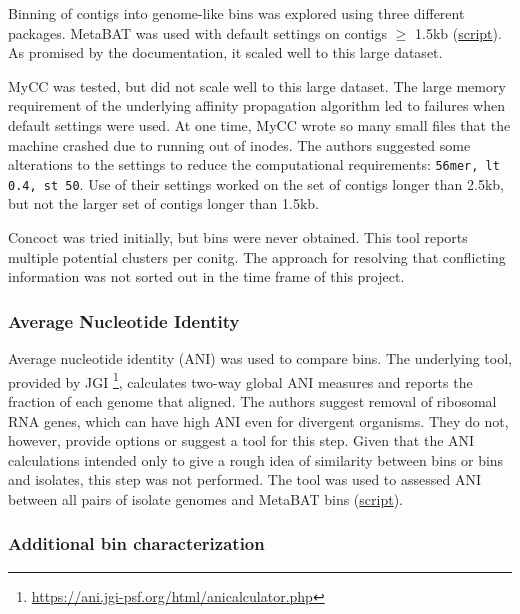 Binning of contigs into genome-like bins was explored using three different packages.
MetaBAT was used with default settings on contigs $\geq$ 1.5kb (\href{https://github.com/BeckResearchLab/meta4/blob/master/m4b_binning/assembly/2.metabat}{script}).
As promised by the documentation, it scaled well to this large dataset. %

MyCC was tested, but did not scale well to this large dataset.
The large memory requirement of the underlying affinity propagation algorithm led to failures when default settings were used.
At one time, MyCC wrote so many small files that the machine crashed due to running out of inodes.
The authors suggested some alterations to the settings to reduce the computational requirements:  \texttt{56mer, lt 0.4, st 50}.
Use of their settings worked on the set of contigs longer than 2.5kb, but not the larger set of contigs longer than 1.5kb.

Concoct was tried initially, but bins were never obtained.
This tool reports multiple potential clusters per conitg.
The approach for resolving that conflicting information was not sorted out in the time frame of this project.

\subsubsection{Average Nucleotide Identity}    %
Average nucleotide identity (ANI) was used to compare bins.
The underlying tool, provided by JGI  \cite{varghese2015} \footnote{\url{https://ani.jgi-psf.org/html/anicalculator.php}}, calculates two-way global ANI measures and reports the fraction of each genome that aligned.
The authors suggest removal of ribosomal RNA genes, which can have high ANI even for divergent organisms.
They do not, however, provide options or suggest a tool for this step.
Given that the ANI calculations intended only to give a rough idea of similarity between bins or bins and isolates, this step was not performed.
The tool was used to assessed ANI between all pairs of isolate genomes and MetaBAT bins (\href{https://github.com/BeckResearchLab/meta4/blob/master/m4b_binning/assembly/ANI/ANIs_of_all_combos.py}{script}).

\subsubsection{Additional bin characterization}    %


